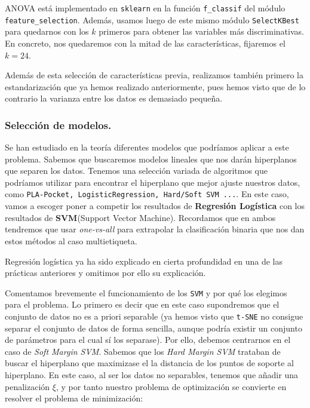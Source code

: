 \documentclass[a4paper, 20pt]{article}
\begin{document}
ANOVA está implementado en \lstinline{sklearn} en la función \lstinline{f_classif} del módulo \lstinline{feature_selection}. Además, usamos luego de este mismo módulo  \lstinline{SelectKBest} para quedarnos con los $k$ primeros para obtener las variables más discriminativas. En concreto, nos quedaremos con la mitad de las características, fijaremos el $k = 24$.

Además de esta selección de características previa, realizamos también primero la estandarización que ya hemos realizado anteriormente, pues hemos visto que de lo contrario la varianza entre los datos es demasiado pequeña.

\subsubsection{Selección de modelos.}

Se han estudiado en la teoría diferentes modelos que podríamos aplicar a este problema. Sabemos que buscaremos modelos lineales que nos darán hiperplanos que separen los datos. Tenemos una selección variada de algoritmos que podríamos utilizar para encontrar el hiperplano que mejor ajuste nuestros datos, como \lstinline{PLA-Pocket, LogisticRegression, Hard/Soft SVM ...}. En este caso, vamos a escoger poner a competir los resultados de \textbf{Regresión Logística} con los resultados de \textbf{SVM}(Support Vector Machine). Recordamos que en ambos tendremos que usar \emph{one-vs-all} para extrapolar la clasificación binaria que nos dan estos métodos al caso multietiqueta.

Regresión logística ya ha sido explicado en cierta profundidad en una de las prácticas anteriores \cite{saez_fjsaezmml_2021} y omitimos por ello su explicación.

Comentamos brevemente el funcionamiento de los \lstinline{SVM} y por qué los elegimos para el problema. Lo primero es decir que en este caso supondremos que el conjunto de datos no es a priori separable (ya hemos visto que \lstinline{t-SNE} no consigue separar el conjunto de datos de forma sencilla, aunque podría existir un conjunto de parámetros para el cual sí los separase). Por ello, debemos centrarnos en el caso de \emph{Soft Margin SVM}. Sabemos que los \emph{Hard Margin SVM} trataban de buscar el hiperplano que maximizase el la distancia de los puntos de soporte al hiperplano. En este caso, al ser los datos no separables, tenemos que añadir una penalización $\xi$, y por tanto nuestro problema de optimización se convierte en resolver el problema de minimización:
\end{document}

